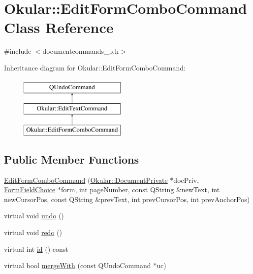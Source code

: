 \hypertarget{classOkular_1_1EditFormComboCommand}{\section{Okular\+:\+:Edit\+Form\+Combo\+Command Class Reference}
\label{classOkular_1_1EditFormComboCommand}
}


{\ttfamily \#include $<$documentcommands\+\_\+p.\+h$>$}

Inheritance diagram for Okular\+:\+:Edit\+Form\+Combo\+Command\+:\begin{figure}[H]
\begin{center}
\leavevmode
\includegraphics[height=3.000000cm]{classOkular_1_1EditFormComboCommand}
\end{center}
\end{figure}
\subsection*{Public Member Functions}
\begin{DoxyCompactItemize}
\item 
\hyperlink{classOkular_1_1EditFormComboCommand_a927c133b741dfea91112f82e5a23a7e6}{Edit\+Form\+Combo\+Command} (\hyperlink{classOkular_1_1DocumentPrivate}{Okular\+::\+Document\+Private} $\ast$doc\+Priv, \hyperlink{classOkular_1_1FormFieldChoice}{Form\+Field\+Choice} $\ast$form, int page\+Number, const Q\+String \&new\+Text, int new\+Cursor\+Pos, const Q\+String \&prev\+Text, int prev\+Cursor\+Pos, int prev\+Anchor\+Pos)
\item 
virtual void \hyperlink{classOkular_1_1EditFormComboCommand_a724169485c94db76cda83d77b0b3df14}{undo} ()
\item 
virtual void \hyperlink{classOkular_1_1EditFormComboCommand_aac1849314081c7635206a99d81a40f00}{redo} ()
\item 
virtual int \hyperlink{classOkular_1_1EditFormComboCommand_a8fec1ca42f0bb1c2cd93c35b55404297}{id} () const 
\item 
virtual bool \hyperlink{classOkular_1_1EditFormComboCommand_a00b4804bcc71b08cd513855bd0c08f02}{merge\+With} (const Q\+Undo\+Command $\ast$uc)
\end{DoxyCompactItemize}
